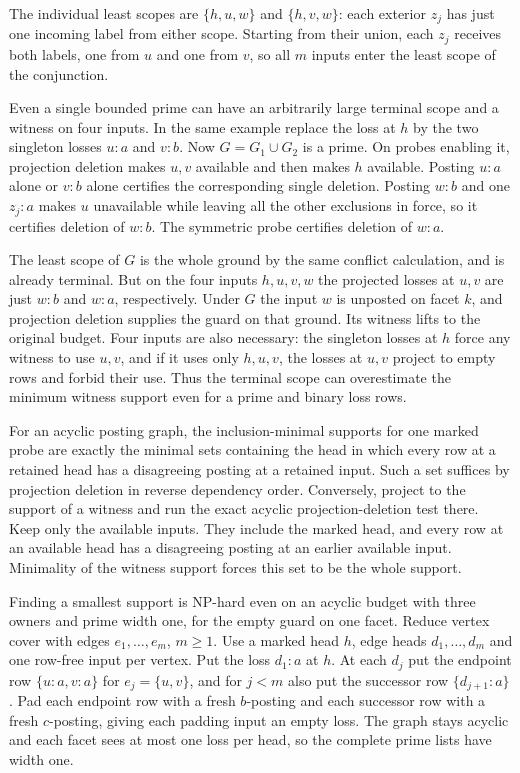 The individual least scopes are $\{h,u,w\}$
and $\{h,v,w\}$: each exterior $z_j$ has just
one incoming label from either scope. Starting
from their union, each $z_j$ receives both
labels, one from $u$ and one from $v$, so all
$m$ inputs enter the least scope of the
conjunction.

Even a single bounded prime can have an
arbitrarily large terminal scope and a witness
on four inputs. In the same example replace
the loss at $h$ by the two singleton losses
$u:a$ and $v:b$. Now $G=G_1\cup G_2$ is a
prime. On probes enabling it, projection
deletion makes $u,v$ available and then
makes $h$ available. Posting $u:a$ alone
or $v:b$ alone certifies the corresponding
single deletion. Posting $w:b$ and one
$z_j:a$ makes $u$ unavailable while leaving
all the other exclusions in force, so it
certifies deletion of $w:b$. The symmetric
probe certifies deletion of $w:a$.

The least scope of $G$ is the whole ground
by the same conflict calculation, and is
already terminal. But on the four inputs
$h,u,v,w$ the projected losses at $u,v$
are just $w:b$ and $w:a$, respectively.
Under $G$ the input $w$ is unposted on
facet $k$, and projection deletion supplies
the guard on that ground. Its witness
lifts to the original budget. Four inputs
are also necessary: the singleton losses
at $h$ force any witness to use $u,v$,
and if it uses only $h,u,v$, the losses
at $u,v$ project to empty rows and forbid
their use. Thus the terminal scope can
overestimate the minimum witness support
even for a prime and binary loss rows.

For an acyclic posting graph, the inclusion-minimal
supports for one marked probe are exactly the
minimal sets containing the head in which every
row at a retained head has a disagreeing posting
at a retained input. Such a set suffices by
projection deletion in reverse dependency order.
Conversely, project to the support of a witness
and run the exact acyclic projection-deletion
test there. Keep only the available inputs.
They include the marked head, and every row at
an available head has a disagreeing posting at
an earlier available input. Minimality of the
witness support forces this set to be the whole
support.

Finding a smallest support is NP-hard even on
an acyclic budget with three owners and prime
width one, for the empty guard on one facet.
Reduce vertex cover with edges $e_1,\ldots,e_m$,
$m\ge1$. Use a marked head $h$, edge heads
$d_1,\ldots,d_m$ and one row-free input per
vertex. Put the loss $d_1:a$ at $h$.
At each $d_j$ put the endpoint row
$\{u:a,v:a\}$ for $e_j=\{u,v\}$, and for $j<m$
also put the successor row $\{d_{j+1}:a\}$.
Pad each endpoint row with a fresh $b$-posting
and each successor row with a fresh $c$-posting,
giving each padding input an empty loss.
The graph stays acyclic and each facet sees
at most one loss per head, so the complete
prime lists have width one.

